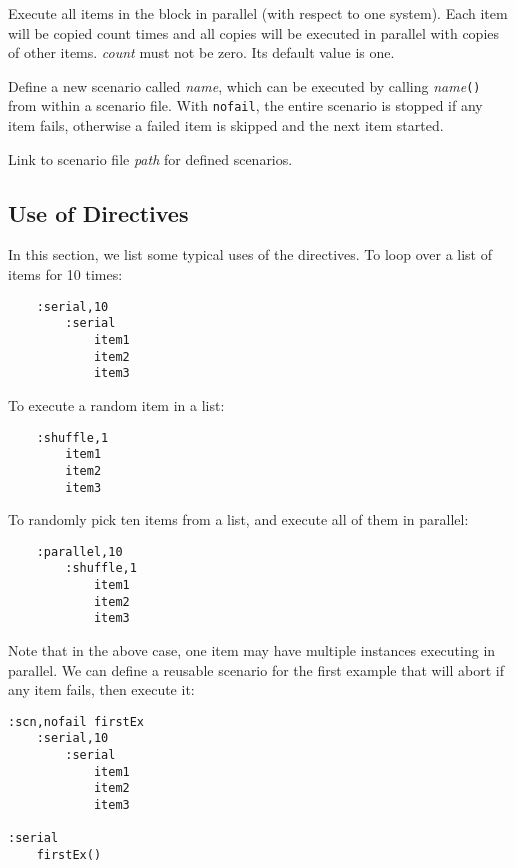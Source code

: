 Execute all items in the block in parallel (with respect to one system). Each
item will be copied count times and all copies will be executed in parallel with
copies of other items. {\it count} must not be zero. Its default value is one.


Define a new scenario called {\it name}, which can be executed by calling {\it
name}{\tt ()} from within a scenario file. With {\tt nofail}, the entire
scenario is stopped if any item fails, otherwise a failed item is skipped and
the next item started.


 Link to scenario file {\it path} for defined
scenarios.

\subsection{Use of Directives}

In this section, we list some typical uses of the directives. To loop over a
list of items for 10 times:
\begin{verbatim}
    :serial,10
        :serial
            item1
            item2
            item3
\end{verbatim}
To execute a random item in a list:
\begin{verbatim}
    :shuffle,1
        item1
        item2
        item3
\end{verbatim}
To randomly pick ten items from a list, and execute all of them in parallel:
\begin{verbatim}
    :parallel,10
        :shuffle,1
            item1
            item2
            item3
\end{verbatim}
Note that in the above case, one item may have multiple instances executing in
parallel. We can define a reusable scenario for the first example that will
abort if any item fails, then execute it:
\begin{verbatim}
:scn,nofail firstEx
    :serial,10
        :serial
            item1
            item2
            item3

:serial
    firstEx()
\end{verbatim}

